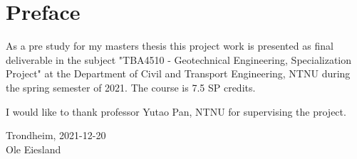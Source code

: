 \section*{Preface}
As a pre study for my masters thesis this project work is presented as final deliverable in the subject "TBA4510 - Geotechnical Engineering, Specialization Project" at the Department of Civil and Transport Engineering, NTNU during the spring semester of 2021. 
The course is 7.5 SP credits.

I would like to thank professor Yutao Pan, NTNU for supervising the project.
\\[2cm]

\begin{center}
Trondheim, 2021-12-20\\[1pc]
Ole Eiesland
\end{center}
